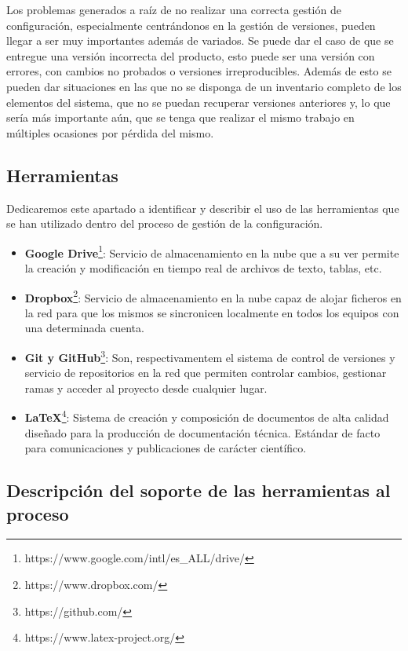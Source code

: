\bigskip

Los problemas generados a raíz de no realizar una correcta gestión de configuración, especialmente centrándonos en la gestión de versiones, pueden llegar a ser muy importantes además de variados. Se puede dar el caso de que se entregue una versión incorrecta del producto, esto puede ser una versión con errores, con cambios no probados o versiones irreproducibles. Además de esto se pueden dar situaciones en las que no se disponga de un inventario completo de los elementos del sistema, que no se puedan recuperar versiones anteriores y, lo que sería más importante aún, que se tenga que realizar el mismo trabajo en múltiples ocasiones por pérdida del mismo. 


\subsection{Herramientas}

Dedicaremos este apartado a identificar y describir el uso de las herramientas que se han utilizado dentro del proceso de gestión de la configuración.

\begin{itemize}
	\item \textbf{Google Drive}\footnote{https://www.google.com/intl/es\_ALL/drive/}: Servicio de almacenamiento en la nube que a su ver permite la creación y modificación en tiempo real de archivos de texto, tablas, etc.
	\item \textbf{Dropbox}\footnote{https://www.dropbox.com/}: Servicio de almacenamiento en la nube capaz de alojar ficheros en la red para que los mismos se sincronicen localmente en todos los equipos con una determinada cuenta.
	\item \textbf{Git y GitHub}\footnote{https://github.com/}: Son, respectivamentem el sistema de control de versiones y servicio de repositorios en la red que permiten controlar cambios, gestionar ramas y acceder al proyecto desde cualquier lugar.
	\item \textbf{LaTeX}\footnote{https://www.latex-project.org/}: Sistema de creación y composición de documentos de alta calidad diseñado para la producción de documentación técnica. Estándar de facto para comunicaciones y publicaciones de carácter científico.
\end{itemize}

\subsection{Descripción del soporte de las herramientas al proceso}

